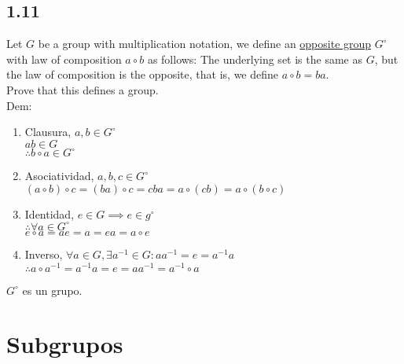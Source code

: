 \documentclass[11pt]{article}
\begin{document}
\subsection*{1.11}
Let $G$ be a group with multiplication notation, we define an \underline{opposite group} $G^\circ$ with law of composition $a\circ b$ as follows: The underlying set is the same as $G$, but the law of composition is the opposite, that is, we define $a\circ b=ba$.\\
Prove that this defines a group.\\
Dem:\\
\begin{enumerate}[label=\arabic*.]
	\item Clausura, $a,b\in G^\circ$\\
	$ab\in G$\\
	$\therefore b\circ a \in G^\circ$
	
	\item Asociatividad, $a,b,c\in G^\circ$\\
	$(a\circ b)\circ c = (ba)\circ c=cba=a\circ (cb)=a\circ(b\circ c)$
	
	\item Identidad, $e\in G \implies e\in g^\circ$\\
	$\therefore \forall a\in G^\circ$\\
	$e\circ a=ae=a=ea=a\circ e$
	
	\item Inverso, $\forall a \in G, \exists a^{-1}\in G:aa^{-1}=e=a^{-1}a$\\
	$\therefore a\circ a^{-1}=a^{-1}a=e=aa^{-1}=a^{-1}\circ a$

\end{enumerate}
$G^\circ$ es un grupo.

\section{Subgrupos}
\end{document}

